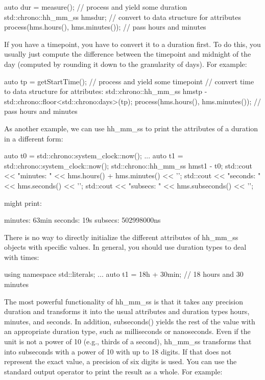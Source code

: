 \begin{cpp}
auto dur = measure(); // process and yield some duration
std::chrono::hh_mm_ss hms{dur}; // convert to data structure for attributes
process(hms.hours(), hms.minutes()); // pass hours and minutes
\end{cpp}

If you have a timepoint, you have to convert it to a duration first. To do this, you usually just compute the difference between the timepoint and midnight of the day (computed by rounding it down to the granularity of days). For example:

\begin{cpp}
auto tp = getStartTime(); // process and yield some timepoint
// convert time to data structure for attributes:
std::chrono::hh_mm_ss hms{tp - std::chrono::floor<std::chrono:days>(tp)};
process(hms.hours(), hms.minutes()); // pass hours and minutes
\end{cpp}

As another example, we can use hh\_mm\_ss to print the attributes of a duration in a different form:

\begin{cpp}
auto t0 = std::chrono::system_clock::now();
...
auto t1 = std::chrono::system_clock::now();
std::chrono::hh_mm_ss hms{t1 - t0};
std::cout << "minutes: " << hms.hours() + hms.minutes() << '\n';
std::cout << "seconds: " << hms.seconds() << '\n';
std::cout << "subsecs: " << hms.subseconds() << '\n';
\end{cpp}

might print:

\begin{shell}
minutes: 63min
seconds: 19s
subsecs: 502998000ns
\end{shell}

There is no way to directly initialize the different attributes of hh\_mm\_ss objects with specific values. In general, you should use duration types to deal with times:

\begin{cpp}
using namespace std::literals;
...
auto t1 = 18h + 30min; // 18 hours and 30 minutes
\end{cpp}

The most powerful functionality of hh\_mm\_ss is that it takes any precision duration and transforms it into the usual attributes and duration types hours, minutes, and seconds. In addition, subseconds() yields the rest of the value with an appropriate duration type, such as milliseconds or nanoseconds. Even if the unit is not a power of 10 (e.g., thirds of a second), hh\_mm\_ss transforms that into subseconds with a power of 10 with up to 18 digits. If that does not represent the exact value, a precision of six digits is used. You can use the standard output operator to print the result as a whole. For example:


